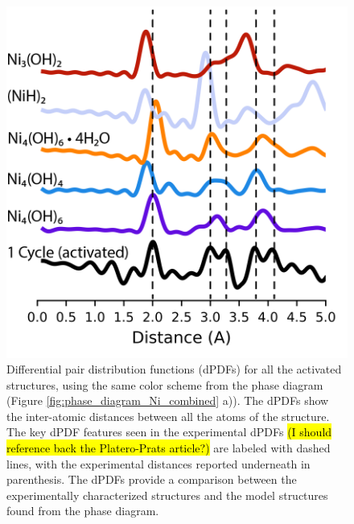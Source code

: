 \documentclass[journal=jctcce,manuscript=article]{achemso}
\begin{document}
\begin{figure}[H]
    \centering
    \includegraphics{zi-images/01-Ni-Graphics/2021-02-25-Ni-trans-dPDFs-manuscript.png}
    \caption{Differential pair distribution functions (dPDFs) for all the activated structures, using the same color scheme from the  phase diagram (Figure \ref{fig:phase_diagram_Ni_combined} a)). The dPDFs show the inter-atomic distances between all the atoms of the structure. The key dPDF features seen in the experimental dPDFs \hl{(I should reference back the Platero-Prats article?)} are labeled with dashed lines, with the experimental distances reported underneath in parenthesis. The dPDFs provide a comparison between the experimentally characterized structures and the model structures found from the phase diagram.}
    \label{fig:dPDFs_TandP_trans_Ni}
\end{figure}
\end{document}
